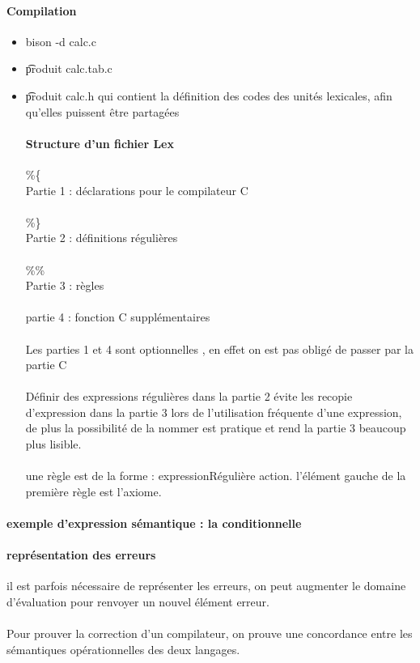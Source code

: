 \documentclass{article}
\begin{document}
\paragraph{Compilation}
\begin{itemize}
\item bison -d calc.c
\item \t produit calc.tab.c 
\item \t produit calc.h qui contient la définition des codes des unités lexicales, afin qu'elles puissent être partagées

\paragraph{Structure d'un fichier Lex} \%\{\\Partie 1 : déclarations pour le compilateur C\\\\\%\}\\Partie 2  :  définitions régulières\\\\\%\%\\Partie 3 :  règles\\\\partie 4 : fonction C supplémentaires\\\\Les parties 1 et 4 sont optionnelles , en effet on est pas obligé de passer par la partie C\\\\Définir des expressions régulières dans la partie  2 évite les recopie d'expression dans la partie 3 lors de l'utilisation fréquente d'une expression, de plus la possibilité de la nommer est pratique et rend la partie 3 beaucoup plus lisible.\\\\ une règle est de la forme : expressionRégulière {action}. l'élément gauche de la première règle est l'axiome.
\end{itemize}


\paragraph{exemple d'expression sémantique : la conditionnelle}
\paragraph{représentation des erreurs} il est parfois nécessaire de représenter les erreurs, on peut augmenter le domaine d'évaluation pour renvoyer un nouvel élément erreur.\\\\Pour prouver la correction d'un compilateur, on prouve une concordance entre les sémantiques opérationnelles des deux langages.
\end{document}
